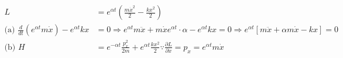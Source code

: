 	\begin{answer}
	\begin{align*}
	L&=e^{\alpha t}\left(\frac{m \dot{x}^{2}}{2}-\frac{k x^{2}}{2}\right)\\
	\text{(a) }\frac{d}{d t}\left(e^{\alpha t} m \dot{x}\right)-e^{\alpha t} k x&=0 \Rightarrow e^{\alpha t} m \ddot{x}+m \dot{x} e^{\alpha t} \cdot \alpha-e^{\alpha t} k x=0 \Rightarrow e^{\alpha t}[m \ddot{x}+\alpha m \dot{x}-k x]=0\\
	\text{(b) }H&=e^{-\alpha t} \frac{p_{x}^{2}}{2 m}+e^{\alpha t} \frac{k x^{2}}{2}
	\because \frac{\partial L}{\partial \dot{x}}=p_{x}=e^{\alpha t} m \dot{x}
	\end{align*}
\end{answer}
